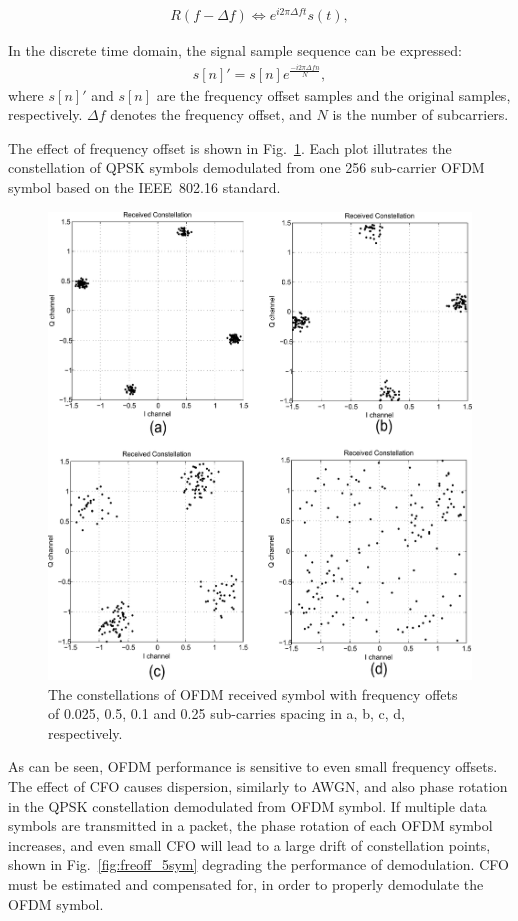 \begin{eqnarray}
\label{equ:}
             R(f - \Delta f) \Leftrightarrow  e^{i2\pi \Delta ft} s(t),
\end{eqnarray}

In the discrete time domain, the signal sample sequence can be expressed:
\begin{eqnarray}
\label{equ:}
            s[n]' = s[n] e^{\frac{− i2\pi \Delta fn}{N}},
\end{eqnarray}
where $s[n]'$ and $s[n]$ are the frequency offset samples and the original samples, respectively.
$\Delta f$ denotes the frequency offset, and $N$ is the number of subcarriers.

The effect of frequency offset is shown in Fig.~\ref{fig:freoff_1sym}. Each plot illutrates the constellation of QPSK symbols demodulated from one 256 sub-carrier OFDM symbol based on the IEEE~802.16 standard.

\begin{figure}
	\centerline{\includegraphics [width=0.8\columnwidth] {Figures/freoff_1sym.pdf} }
	\caption{The constellations of OFDM received symbol with frequency offets of 0.025, 0.5, 0.1 and 0.25 sub-carries spacing in a, b, c, d, respectively.}
	\label{fig:freoff_1sym}
\end{figure}

As can be seen, OFDM performance is sensitive to even small frequency offsets.
The effect of CFO causes dispersion, similarly to AWGN, and also phase rotation in the QPSK constellation demodulated from OFDM symbol.
If multiple data symbols are transmitted in a packet, the phase rotation of each OFDM symbol increases, and even small CFO will lead to a large drift of constellation points, shown in Fig.~\ref{fig:freoff_5sym} degrading the performance of demodulation. CFO must be estimated and compensated for, in order to properly demodulate the OFDM symbol.

